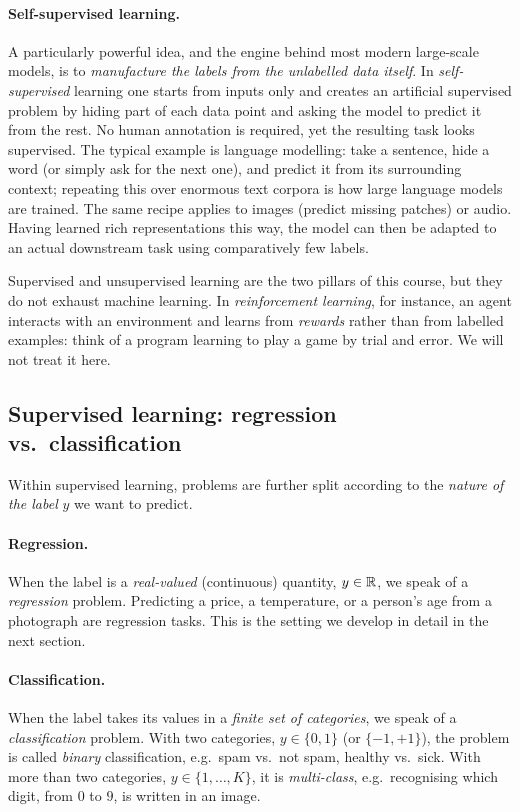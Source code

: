 \paragraph{Self-supervised learning.}
A particularly powerful idea, and the engine behind most modern large-scale
models, is to \emph{manufacture the labels from the unlabelled data itself}.
In \emph{self-supervised} learning one starts from inputs only and creates an
artificial supervised problem by hiding part
of each data point and asking the model to predict it from the rest. No human
annotation is required, yet the resulting task looks supervised. The typical
example is language modelling: take a sentence, hide a word (or simply ask for
the next one), and predict it from its surrounding context; repeating this over
enormous text corpora is how large language models are trained. The same recipe
applies to images (predict missing patches) or audio. Having learned rich
representations this way, the model can then be adapted to an actual downstream
task using comparatively few labels.

\begin{remark}
Supervised and unsupervised learning are the two pillars of this course, but
they do not exhaust machine learning. In \emph{reinforcement learning}, for
instance, an agent interacts with an environment and learns from \emph{rewards}
rather than from labelled examples: think of a program learning to play a
game by trial and error. We will not treat it here.
\end{remark}

\subsection{Supervised learning: regression vs.\ classification}

Within supervised learning, problems are further split according to the
\emph{nature of the label} $y$ we want to predict.

\paragraph{Regression.}
When the label is a \emph{real-valued} (continuous) quantity, $y \in \mathbb{R}$, we
speak of a \emph{regression} problem. Predicting a price, a temperature, or a
person's age from a photograph are regression tasks. This is the setting we
develop in detail in the next section.

\paragraph{Classification.}
When the label takes its values in a \emph{finite set of categories}, we speak
of a \emph{classification} problem. With two categories,
$y \in \{0, 1\}$ (or $\{-1, +1\}$), the problem is called \emph{binary}
classification, e.g.\ spam vs.\ not spam, healthy vs.\ sick. With more than
two categories, $y \in \{1, \dots, K\}$, it is \emph{multi-class}, e.g.\
recognising which digit, from $0$ to $9$, is written in an image.

